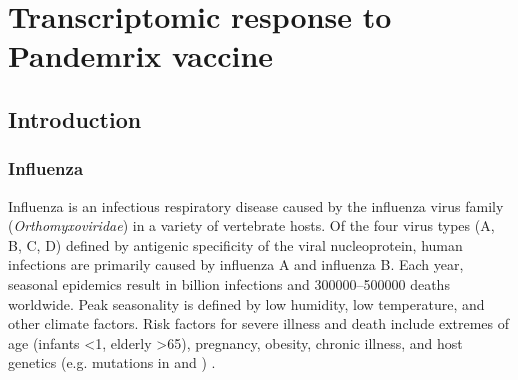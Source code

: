%
%

\chapter{Transcriptomic response to Pandemrix vaccine}
\label{ch:hird_DGE}


\section{Introduction}


\subsection{Influenza}

Influenza is an infectious respiratory disease caused by the influenza virus family (\textit{Orthomyxoviridae}) in a variety of vertebrate hosts.
Of the four virus types (A, B, C, D) defined by antigenic specificity of the viral nucleoprotein,
human infections are primarily caused by influenza A and influenza B.
Each year, seasonal epidemics result in  billion infections and \numrange{300000}{500000} deaths worldwide.
Peak seasonality is defined by low humidity, low temperature, and other climate factors.
Risk factors for severe illness and death include extremes of age (infants \SI{<1}{\year}, elderly \SI{>65}{\year}), pregnancy, obesity, chronic illness, and host genetics (e.g. mutations in  and ) \autocite{krammer2018Influenza,dhakal2019HostFactorsImpact}.

